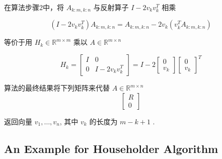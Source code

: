 \begin{theorem}
     在算法步骤2中，将 $ A_{k: m, k: n} $ 与反射算子 $ I-2 v_{k} v_{k}^{T} $ 相乘

    \begin{equation} \left(I-2 v_{k} v_{k}^{T}\right) A_{k: m, k: n}=A_{k: m, k: n}-2 v_{k}\left(v_{k}^{T} A_{k: m, k: n}\right) \end{equation}

    等价于用 $ H_{k} \in \mathbb{R}^{m \times m} $ 乘以 $ A \in \mathbb{R}^{m \times n}  $

    \begin{equation} H_{k}=\left[\begin{array}{cc}I & 0 \\ 0 & I-2 v_{k} v_{k}^{T}\end{array}\right]=I-2\left[\begin{array}{c}0 \\ v_{k}\end{array}\right]\left[\begin{array}{l}0 \\ v_{k}\end{array}\right]^{T} \end{equation}
\end{theorem}

   

算法的最终结果将下列矩阵来代替 $ A\in \mathbb{R}^{m \times n}  $
\begin{equation}
\left[\begin{array}{c}
R \\
0
\end{array}\right]
\end{equation}

返回向量 $ v_{1}, \ldots, v_{n} $, 其中 $ v_{k} $ 的长度为 $ m-k+1 $ .



\subsection{An Example for Householder Algorithm}

